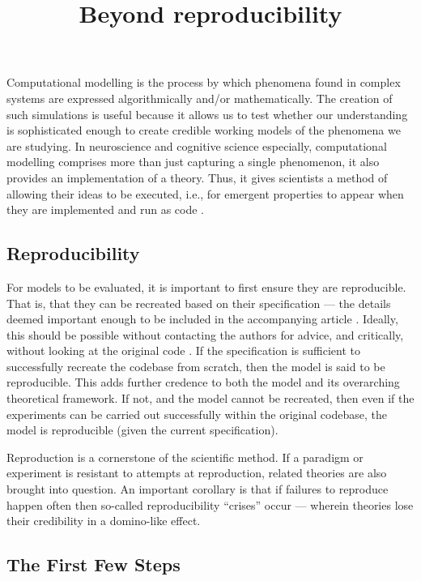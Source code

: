 \documentclass[jou]{apa6}
\title{Beyond reproducibility}
\begin{document}
\maketitle

Computational modelling is the process by which phenomena found in complex
systems are expressed algorithmically and/or mathematically.
The creation of such simulations is useful because it allows us to
test whether our understanding is sophisticated enough to create credible
working models of the phenomena we are studying.
In neuroscience and cognitive science especially, computational modelling comprises more than just capturing a single phenomenon, it also provides an implementation of a theory.
Thus, it gives scientists a method of allowing their ideas to be executed, i.e., for emergent properties to appear when they are implemented and run as code \cite{mcclelland09}.

\subsection*{Reproducibility}

For models to be evaluated, it is important to first ensure they are reproducible. 
That is, that they can be recreated based on their specification --- the details deemed important enough to be included in the accompanying article \cite{hinsen15}.
Ideally, this should be possible without contacting the authors for advice, and critically, without looking at the original code \cite{cooper14}.
If the specification is sufficient to successfully recreate the codebase from scratch, then the model is said to be reproducible.
This adds further credence to both the model and its overarching theoretical
framework.
If not, and the model cannot be recreated, then even if the experiments can be carried out successfully within the original codebase, the model is reproducible (given the current specification).

Reproduction is a cornerstone of the scientific method.
If a paradigm or experiment is resistant to attempts at reproduction, related
theories are also brought into question.
An important corollary is that if failures to reproduce happen often then so-called reproducibility ``crises'' occur --- wherein theories lose their credibility in a domino-like effect.


\subsection*{The First Few Steps}
\end{document}
